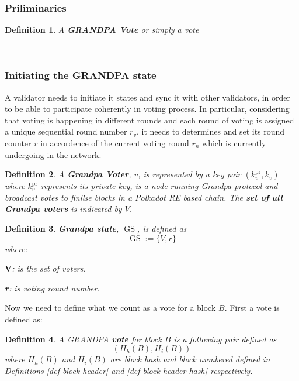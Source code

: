 \documentclass{article}
\newcommand{\assign}{:=}
\newcommand{\tmmathbf}[1]{\ensuremath{\boldsymbol{#1}}}
\newcommand{\tmop}[1]{\ensuremath{\operatorname{#1}}}
\newcommand{\tmstrong}[1]{\textbf{#1}}
\newcommand{\tmtextbf}[1]{{\bfseries{#1}}}
\newtheorem{definition}{Definition}
\providecommand{\tmop}[1]{\ensuremath{\mathrm{#1}}}
\providecommand{\tmstrong}[1]{\tmtextbf{#1}}
\providecommand{\tmtextbf}[1]{\tmtextbf{#1}}
\newtheorem{definition}{Definition}
\begin{document}
\subsubsection{Priliminaries}

\begin{definition}
  \label{def-vote}A {\tmstrong{GRANDPA Vote }}or simply a vote
\end{definition}

\

\subsubsection{Initiating the GRANDPA state}

A validator needs to initiate it states and sync it with other validators, in
order to be able to participate coherently in voting process. In particular,
considering that voting is happening in different rounds and each round of
voting is assigned a unique sequential round number $r_v$, it needs to
determines and set its round counter $r$ in accordence of the current voting
round $r_n$ which is currently undergoing in the network.

\begin{definition}
  A {\tmstrong{Grandpa Voter}}, $v$, is represented by a key pair
  $(k^{\tmop{pr}}_v, k_v)$ where $k_v^{\tmop{pr}}$ represents its private key,
  is a node running Grandpa protocol and broadcast votes to finilse blocks in
  a Polkadot RE based chain. The {\tmstrong{set of all Grandpa voters}} is
  indicated by $V$.
\end{definition}

\begin{definition}
  {\tmstrong{Grandpa state}}, $\tmop{GS}$, is defined as
  \[ \tmop{GS} \assign \{V, r\} \]
  where:
  
  $\tmmathbf{V}$: is the set of voters.
  
  {\tmstrong{r}}: is voting round number.
\end{definition}

Now we need to define what we count as a vote for a block $B$. First a vote is
defined as:

\begin{definition}
  A GRANDPA {\tmstrong{vote}} for block $B$ is a following pair defined as
  \[ (H_h (B), H_i (B)) \]
  where $H_h (B)$ and $H_i (B)$ are block hash and block numbered defined in
  Definitions \ref{def-block-header} and \ref{def-block-header-hash}
  respectively.
\end{definition}
\end{document}
